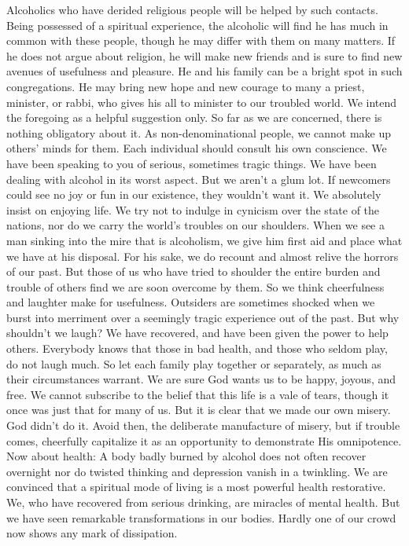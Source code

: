 \begin{biblechapter}
Alcoholics who have derided religious people will be helped by such contacts.  Being possessed of a spiritual experience, the alcoholic will find he has much in common with these people, though he may differ with them on many matters.  If he does not argue about religion, he will make new friends and is sure to find new avenues of usefulness and pleasure.  He and his family can be a bright spot in such congregations.  He may bring new hope and new courage to many a priest, minister, or rabbi, who gives his all to minister to our troubled world.  We intend the foregoing as a helpful suggestion only.  So far as we are concerned, there is nothing obligatory about it.  As non-denominational people, we cannot make up others' minds for them.  Each individual should consult his own conscience.
We have been speaking to you of serious, sometimes tragic things.  We have been dealing with alcohol in its worst aspect.  But we aren't a glum lot.  If newcomers could see no joy or fun in our existence, they wouldn't want it.  We absolutely insist on enjoying life.  We try not to indulge in cynicism over the state of the nations, nor do we carry the world's troubles on our shoulders.  When we see a man sinking into the mire that is alcoholism, we give him first aid and place what we have at his disposal.  For his sake, we do recount and almost relive the horrors of our past.  But those of us who have tried to shoulder the entire burden and trouble of others find we are soon overcome by them.
So we think cheerfulness and laughter make for usefulness.  Outsiders are sometimes shocked when we burst into merriment over a seemingly tragic experience out of the past.  But why shouldn't we laugh?  We have recovered, and have been given the power to help others.
Everybody knows that those in bad health, and those who seldom play, do not laugh much.  So let each family play together or separately, as much as their circumstances warrant.  We are sure God wants us to be happy, joyous, and free.  We cannot subscribe to the belief that this life is a vale of tears, though it once was just that for many of us.  But it is clear that we made our own misery.  God didn't do it.  Avoid then, the deliberate manufacture of misery, but if trouble comes, cheerfully capitalize it as an opportunity to demonstrate His omnipotence.
Now about health:  A body badly burned by alcohol does not often recover overnight nor do twisted thinking and depression vanish in a twinkling.  We are convinced that a spiritual mode of living is a most powerful health restorative.  We, who have recovered from serious drinking, are miracles of mental health.  But we have seen remarkable transformations in our bodies.  Hardly one of our crowd now shows any mark of dissipation.

\end{biblechapter}
